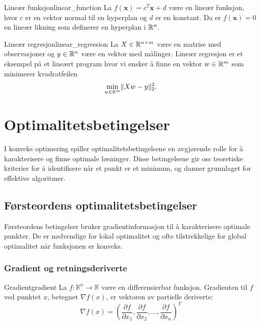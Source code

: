 \begin{example}{Lineær funksjon}{linear_function}
	La \(f(\symbf{x}) = c^T\symbf{x} + d\) være en lineær funksjon, hvor \(c\) er en vektor normal til en hyperplan og \(d\) er en konstant.
	Da er \(f(\symbf{x}) = 0\) en lineær likning som definerer en hyperplan i \(\mathbb{R}^n\).
\end{example}

\begin{example}{Lineær regresjon}{linear_regression}
	La \(X \in \mathbb{R}^{n \times m}\) være en matrise med observasjoner og \(y \in \mathbb{R}^n\) være en vektor med målinger.
	Lineær regresjon er et eksempel på et lineært program hvor vi ønsker å finne en vektor \(w \in \mathbb{R}^m\) som minimerer kvadratfeilen
	\begin{equation*}
		\min_{w \in \mathbb{R}^m} \lVert Xw - y\rVert_2^2.
	\end{equation*}
\end{example}

\chapter{Optimalitetsbetingelser}
\label{chap:optimality_conditions}

I konveks optimering spiller optimalitetsbetingelsene en avgjørende rolle for å karakterisere og finne optimale løsninger. Disse betingelsene gir oss teoretiske kriterier for å identifisere når et punkt er et minimum, og danner grunnlaget for effektive algoritmer.

\section{Førsteordens optimalitetsbetingelser}

Førsteordens betingelser bruker gradientinformasjon til å karakterisere optimale punkter. De er nødvendige for lokal optimalitet og ofte tilstrekkelige for global optimalitet når funksjonen er konveks.

\subsection{Gradient og retningsderiverte}

\begin{definition}{Gradient}{gradient}
	La $f: \mathbb{R}^n \to \mathbb{R}$ være en differensierbar funksjon. Gradienten til $f$ ved punktet $x$, betegnet $\nabla f(x)$, er vektoren av partielle deriverte:
	\[
		\nabla f(x) = \left(\frac{\partial f}{\partial x_1}, \frac{\partial f}{\partial x_2}, \ldots, \frac{\partial f}{\partial x_n}\right)^T
	\]
\end{definition}

